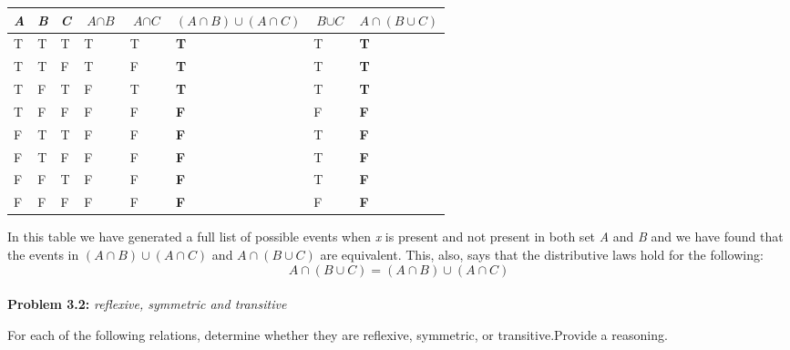 \documentclass[a4paper,12pt]{article}
\begin{document}
    \begin{table}[H]
        \begin{center}
            \begin{tabular}{| l | l | l || l | l | l | l | l |}
                \midrule
                \textit{A}& \textit{B}& \textit{C} & $\textit{A} \cap \textit{B}$ & $\textit{A} \cap \textit{C}$ & \textbf{$(\textit{A} \cap \textit{B}) \cup (\textit{A} \cap \textit{C})$} & $\textit{B} \cup \textit{C}$ & \textbf{$\textit{A} \cap (\textit{B} \cup \textit{C})$}\\
                \midrule\midrule
                T & T & T & T & T & \textbf{T} & T & \textbf{T}\\
                \midrule
                T & T & F & T & F & \textbf{T} & T & \textbf{T}\\
                \midrule
                T & F & T & F & T & \textbf{T} & T & \textbf{T}\\
                \midrule
                T & F & F & F & F & \textbf{F} & F & \textbf{F}\\
                \midrule
                F & T & T & F & F & \textbf{F} & T & \textbf{F}\\
                \midrule
                F & T & F & F & F & \textbf{F} & T & \textbf{F}\\
                \midrule
                F & F & T & F & F & \textbf{F} & T & \textbf{F}\\
                \midrule
                F & F & F & F & F & \textbf{F} & F & \textbf{F}\\
                \midrule
            \end{tabular}
        \end{center}
    \end{table}
    In this table we have generated a full list of possible events when \textit{x} is present and not present in both set \textit{A} and \textit{B} and we have found that the events in $( \textit{A} \cap \textit{B} ) \cup ( \textit{A} \cap \textit{C} )$ and $\textit{A} \cap (\textit{B} \cup \textit{C})$ are equivalent.
    This, also, says that the distributive laws hold for the following:
    $$ \textit{A} \cap (\textit{B} \cup \textit{C}) = ( \textit{A} \cap \textit{B} ) \cup ( \textit{A} \cap \textit{C} )$$\\


    \textbf{Problem 3.2: } \textit{reflexive, symmetric and transitive}

    For each of the following relations, determine whether they are reflexive, symmetric, or transitive.Provide a reasoning.\\
\end{document}
